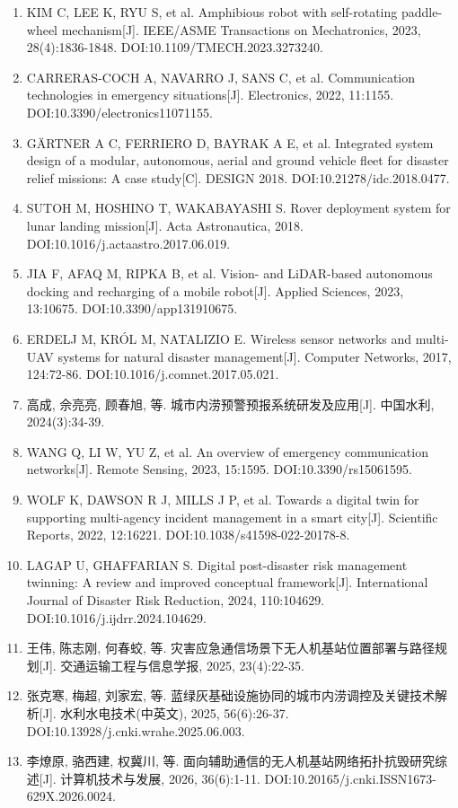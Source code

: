 \documentclass[UTF8,a4paper,zihao=-4]{ctexart}
\begin{document}
\begin{enumerate}
\item KIM C, LEE K, RYU S, et al. Amphibious robot with self-rotating paddle-wheel mechanism[J]. IEEE/ASME Transactions on Mechatronics, 2023, 28(4):1836-1848. DOI:10.1109/TMECH.2023.3273240.

\item CARRERAS-COCH A, NAVARRO J, SANS C, et al. Communication technologies in emergency situations[J]. Electronics, 2022, 11:1155. DOI:10.3390/electronics11071155.

\item GÄRTNER A C, FERRIERO D, BAYRAK A E, et al. Integrated system design of a modular, autonomous, aerial and ground vehicle fleet for disaster relief missions: A case study[C]. DESIGN 2018. DOI:10.21278/idc.2018.0477.

\item SUTOH M, HOSHINO T, WAKABAYASHI S. Rover deployment system for lunar landing mission[J]. Acta Astronautica, 2018. DOI:10.1016/j.actaastro.2017.06.019.

\item JIA F, AFAQ M, RIPKA B, et al. Vision- and LiDAR-based autonomous docking and recharging of a mobile robot[J]. Applied Sciences, 2023, 13:10675. DOI:10.3390/app131910675.

\item ERDELJ M, KRÓL M, NATALIZIO E. Wireless sensor networks and multi-UAV systems for natural disaster management[J]. Computer Networks, 2017, 124:72-86. DOI:10.1016/j.comnet.2017.05.021.

\item 高成, 佘亮亮, 顾春旭, 等. 城市内涝预警预报系统研发及应用[J]. 中国水利, 2024(3):34-39.

\item WANG Q, LI W, YU Z, et al. An overview of emergency communication networks[J]. Remote Sensing, 2023, 15:1595. DOI:10.3390/rs15061595.

\item WOLF K, DAWSON R J, MILLS J P, et al. Towards a digital twin for supporting multi-agency incident management in a smart city[J]. Scientific Reports, 2022, 12:16221. DOI:10.1038/s41598-022-20178-8.

\item LAGAP U, GHAFFARIAN S. Digital post-disaster risk management twinning: A review and improved conceptual framework[J]. International Journal of Disaster Risk Reduction, 2024, 110:104629. DOI:10.1016/j.ijdrr.2024.104629.

\item 王伟, 陈志刚, 何春蛟, 等. 灾害应急通信场景下无人机基站位置部署与路径规划[J]. 交通运输工程与信息学报, 2025, 23(4):22-35.

\item 张克寒, 梅超, 刘家宏, 等. 蓝绿灰基础设施协同的城市内涝调控及关键技术解析[J]. 水利水电技术(中英文), 2025, 56(6):26-37. DOI:10.13928/j.cnki.wrahe.2025.06.003.

\item 李燎原, 骆西建, 权冀川, 等. 面向辅助通信的无人机基站网络拓扑抗毁研究综述[J]. 计算机技术与发展, 2026, 36(6):1-11. DOI:10.20165/j.cnki.ISSN1673-629X.2026.0024.

\end{enumerate}
\end{document}
